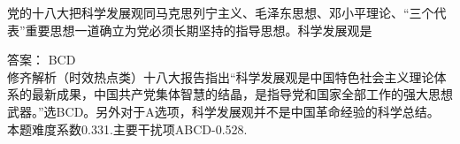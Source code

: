 \question 党的十八大把科学发展观同马克思列宁主义、毛泽东思想、邓小平理论、``三个代表''重要思想一道确立为党必须长期坚持的指导思想。科学发展观是~~~
\par{}
\begin{solution}答案： BCD\\
修齐解析（时效热点类）十八大报告指出``科学发展观是中国特色社会主义理论体系的最新成果，中国共产党集体智慧的结晶，是指导党和国家全部工作的强大思想武器。''选BCD。另外对于A选项，科学发展观并不是中国革命经验的科学总结。\\
本题难度系数0.331.主要干扰项ABCD-0.528.
\end{solution}
